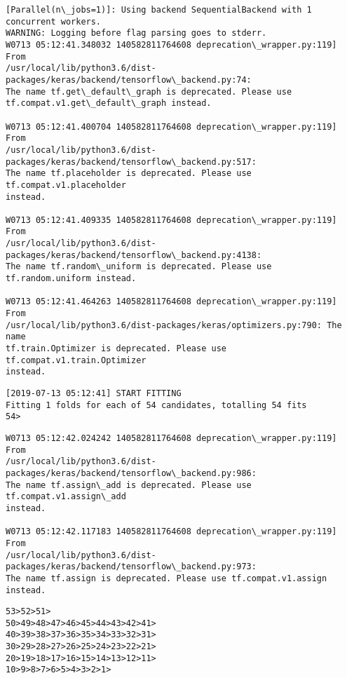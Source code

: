 \documentclass[11pt]{article}
\begin{document}
    \begin{Verbatim}[commandchars=\\\{\}]
[Parallel(n\_jobs=1)]: Using backend SequentialBackend with 1 concurrent workers.
WARNING: Logging before flag parsing goes to stderr.
W0713 05:12:41.348032 140582811764608 deprecation\_wrapper.py:119] From
/usr/local/lib/python3.6/dist-packages/keras/backend/tensorflow\_backend.py:74:
The name tf.get\_default\_graph is deprecated. Please use
tf.compat.v1.get\_default\_graph instead.

W0713 05:12:41.400704 140582811764608 deprecation\_wrapper.py:119] From
/usr/local/lib/python3.6/dist-packages/keras/backend/tensorflow\_backend.py:517:
The name tf.placeholder is deprecated. Please use tf.compat.v1.placeholder
instead.

W0713 05:12:41.409335 140582811764608 deprecation\_wrapper.py:119] From
/usr/local/lib/python3.6/dist-packages/keras/backend/tensorflow\_backend.py:4138:
The name tf.random\_uniform is deprecated. Please use tf.random.uniform instead.

W0713 05:12:41.464263 140582811764608 deprecation\_wrapper.py:119] From
/usr/local/lib/python3.6/dist-packages/keras/optimizers.py:790: The name
tf.train.Optimizer is deprecated. Please use tf.compat.v1.train.Optimizer
instead.

    \end{Verbatim}

    \begin{Verbatim}[commandchars=\\\{\}]
[2019-07-13 05:12:41] START FITTING
Fitting 1 folds for each of 54 candidates, totalling 54 fits
54>
    \end{Verbatim}

    \begin{Verbatim}[commandchars=\\\{\}]
W0713 05:12:42.024242 140582811764608 deprecation\_wrapper.py:119] From
/usr/local/lib/python3.6/dist-packages/keras/backend/tensorflow\_backend.py:986:
The name tf.assign\_add is deprecated. Please use tf.compat.v1.assign\_add
instead.

W0713 05:12:42.117183 140582811764608 deprecation\_wrapper.py:119] From
/usr/local/lib/python3.6/dist-packages/keras/backend/tensorflow\_backend.py:973:
The name tf.assign is deprecated. Please use tf.compat.v1.assign instead.

    \end{Verbatim}

    \begin{Verbatim}[commandchars=\\\{\}]
53>52>51>
50>49>48>47>46>45>44>43>42>41>
40>39>38>37>36>35>34>33>32>31>
30>29>28>27>26>25>24>23>22>21>
20>19>18>17>16>15>14>13>12>11>
10>9>8>7>6>5>4>3>2>1>
    \end{Verbatim}
\end{document}
